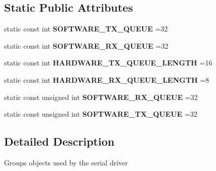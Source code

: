 \subsection*{Static Public Attributes}
\begin{DoxyCompactItemize}
\item 
\hypertarget{classmiosix_1_1_serial_data_a235e22eef7b7be8b3d618217d4c57d39}{static const int {\bfseries S\-O\-F\-T\-W\-A\-R\-E\-\_\-\-T\-X\-\_\-\-Q\-U\-E\-U\-E} =32}\label{classmiosix_1_1_serial_data_a235e22eef7b7be8b3d618217d4c57d39}

\item 
\hypertarget{classmiosix_1_1_serial_data_a6fc0991f5ffaae17cabd89fe94de1d20}{static const int {\bfseries S\-O\-F\-T\-W\-A\-R\-E\-\_\-\-R\-X\-\_\-\-Q\-U\-E\-U\-E} =32}\label{classmiosix_1_1_serial_data_a6fc0991f5ffaae17cabd89fe94de1d20}

\item 
\hypertarget{classmiosix_1_1_serial_data_a6254006617d5233f936dca7659e8e398}{static const int {\bfseries H\-A\-R\-D\-W\-A\-R\-E\-\_\-\-T\-X\-\_\-\-Q\-U\-E\-U\-E\-\_\-\-L\-E\-N\-G\-T\-H} =16}\label{classmiosix_1_1_serial_data_a6254006617d5233f936dca7659e8e398}

\item 
\hypertarget{classmiosix_1_1_serial_data_a94e6baeefd8e933a8bb7a50eaa5740d2}{static const int {\bfseries H\-A\-R\-D\-W\-A\-R\-E\-\_\-\-R\-X\-\_\-\-Q\-U\-E\-U\-E\-\_\-\-L\-E\-N\-G\-T\-H} =8}\label{classmiosix_1_1_serial_data_a94e6baeefd8e933a8bb7a50eaa5740d2}

\item 
\hypertarget{classmiosix_1_1_serial_data_a1f57cb779ae2cfbc0c3ae155cc8f5995}{static const unsigned int {\bfseries S\-O\-F\-T\-W\-A\-R\-E\-\_\-\-R\-X\-\_\-\-Q\-U\-E\-U\-E} =32}\label{classmiosix_1_1_serial_data_a1f57cb779ae2cfbc0c3ae155cc8f5995}

\item 
\hypertarget{classmiosix_1_1_serial_data_ac1babced6e4acd8450329a7956312ed0}{static const unsigned int {\bfseries S\-O\-F\-T\-W\-A\-R\-E\-\_\-\-T\-X\-\_\-\-Q\-U\-E\-U\-E} =32}\label{classmiosix_1_1_serial_data_ac1babced6e4acd8450329a7956312ed0}

\end{DoxyCompactItemize}


\subsection{Detailed Description}
Groups objects used by the serial driver 


